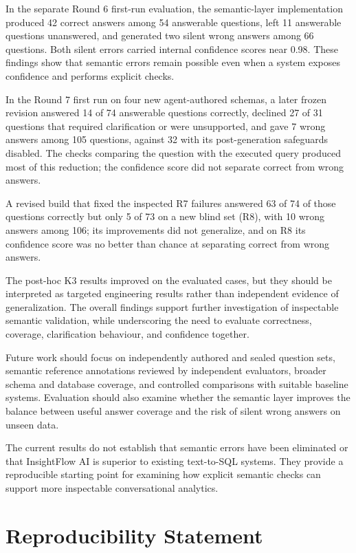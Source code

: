 \documentclass[conference]{IEEEtran}
\begin{document}
In the separate Round 6 first-run evaluation, the semantic-layer implementation produced 42 correct answers among 54 answerable questions, left 11 answerable questions unanswered, and generated two silent wrong answers among 66 questions. Both silent errors carried internal confidence scores near 0.98. These findings show that semantic errors remain possible even when a system exposes confidence and performs explicit checks.

In the Round 7 first run on four new agent-authored schemas, a later frozen revision answered 14 of 74 answerable questions correctly, declined 27 of 31 questions that required clarification or were unsupported, and gave 7 wrong answers among 105 questions, against 32 with its post-generation safeguards disabled. The checks comparing the question with the executed query produced most of this reduction; the confidence score did not separate correct from wrong answers.

A revised build that fixed the inspected R7 failures answered 63 of 74 of those questions correctly but only 5 of 73 on a new blind set (R8), with 10 wrong answers among 106; its improvements did not generalize, and on R8 its confidence score was no better than chance at separating correct from wrong answers.

The post-hoc K3 results improved on the evaluated cases, but they should be interpreted as targeted engineering results rather than independent evidence of generalization. The overall findings support further investigation of inspectable semantic validation, while underscoring the need to evaluate correctness, coverage, clarification behaviour, and confidence together.

Future work should focus on independently authored and sealed question sets, semantic reference annotations reviewed by independent evaluators, broader schema and database coverage, and controlled comparisons with suitable baseline systems. Evaluation should also examine whether the semantic layer improves the balance between useful answer coverage and the risk of silent wrong answers on unseen data.

The current results do not establish that semantic errors have been eliminated or that InsightFlow AI is superior to existing text-to-SQL systems. They provide a reproducible starting point for examining how explicit semantic checks can support more inspectable conversational analytics.

\section*{Reproducibility Statement}
\end{document}
